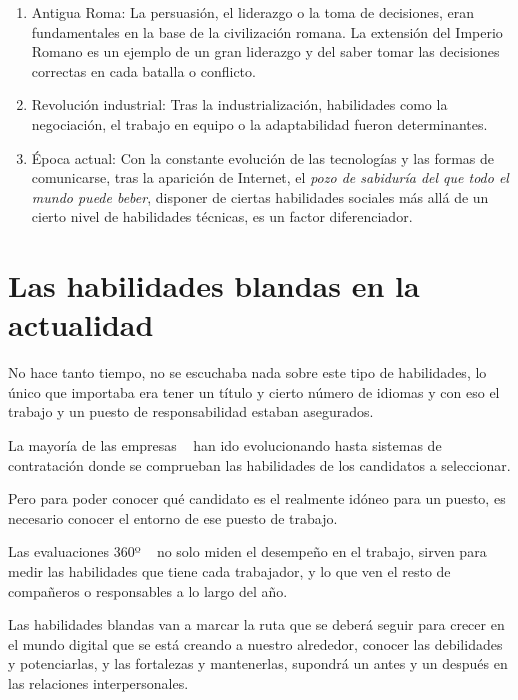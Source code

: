 \begin{enumerate}
	\item Antigua Roma: La persuasión, el liderazgo o la toma de decisiones, eran fundamentales en la base de la civilización romana. La extensión del Imperio Romano es un ejemplo de un gran liderazgo y del saber tomar las decisiones correctas en cada batalla o conflicto.
	\item Revolución industrial: Tras la industrialización, habilidades como la negociación, el trabajo en equipo o la adaptabilidad fueron determinantes.
	\item Época actual: Con la constante evolución de las tecnologías y las formas de comunicarse, tras la aparición de Internet, el \textit{pozo de sabiduría del que todo el mundo puede beber}, disponer de ciertas habilidades sociales más allá de un cierto nivel de habilidades técnicas, es un factor diferenciador.
\end{enumerate}

\section{Las habilidades blandas en la actualidad}

No hace tanto tiempo, no se escuchaba nada sobre este tipo de habilidades, lo único que importaba era tener un título y cierto número de idiomas y con eso el trabajo y un puesto de responsabilidad estaban asegurados.

La mayoría de las empresas ~\cite{doc:skills} han ido evolucionando hasta sistemas de contratación donde se comprueban las habilidades de los candidatos a seleccionar.

Pero para poder conocer qué candidato es el realmente idóneo para un puesto, es necesario conocer el entorno de ese puesto de trabajo.

Las evaluaciones 360º ~\cite{doc:eva360} no solo miden el desempeño en el trabajo, sirven para medir las habilidades que tiene cada trabajador, y lo que ven el resto de compañeros o responsables a lo largo del año.

Las habilidades blandas van a marcar la ruta que se deberá seguir para crecer en el mundo digital que se está creando a nuestro alrededor, conocer las debilidades y potenciarlas, y las fortalezas y mantenerlas, supondrá un antes y un después en las relaciones interpersonales.



